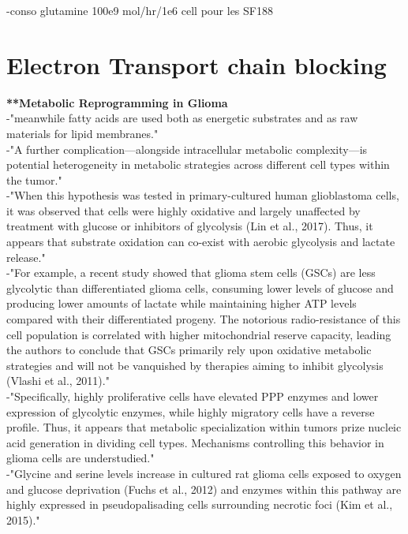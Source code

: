 \documentclass[11pt,a4paper]{article}
\begin{document}
-conso glutamine 100e9 mol/hr/1e6 cell pour les SF188

\section{Electron Transport chain blocking}
\textbf{**Metabolic Reprogramming in Glioma}\\
-"meanwhile fatty acids are used both as energetic substrates and as raw materials for lipid membranes."\\

-"A further complication—alongside intracellular metabolic complexity—is potential heterogeneity in metabolic strategies across different cell types within the tumor."\\

-"When this hypothesis was tested in primary-cultured human glioblastoma cells, it was observed that cells were highly oxidative and largely unaffected by treatment with glucose or inhibitors of glycolysis (Lin et al., 2017). Thus, it appears that substrate oxidation can co-exist with aerobic glycolysis and lactate release."\\

-"For example, a recent study showed that glioma stem cells (GSCs) are less glycolytic than differentiated glioma cells, consuming lower levels of glucose and producing lower amounts of lactate while maintaining higher ATP levels compared with their differentiated progeny. The notorious radio-resistance of this cell population is correlated with higher mitochondrial reserve capacity, leading the authors to conclude that GSCs primarily rely upon oxidative metabolic strategies and will not be vanquished by therapies aiming to inhibit glycolysis (Vlashi et al., 2011)."\\

-"Specifically, highly proliferative cells have elevated PPP enzymes and lower expression of glycolytic enzymes, while highly migratory cells have a reverse profile. Thus, it appears that metabolic specialization within tumors prize nucleic acid generation in dividing cell types. Mechanisms controlling this behavior in glioma cells are understudied."\\

-"Glycine and serine levels increase in cultured rat glioma cells exposed to oxygen and glucose deprivation (Fuchs et al., 2012) and enzymes within this pathway are highly expressed in pseudopalisading cells surrounding necrotic foci (Kim et al., 2015)."\\
\end{document}

